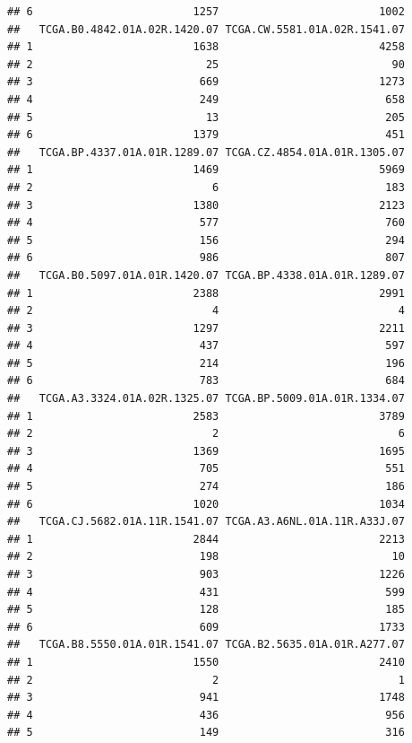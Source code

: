 \documentclass[
]{article}
\begin{document}
\begin{verbatim}
## 6                         1257                         1002
##   TCGA.B0.4842.01A.02R.1420.07 TCGA.CW.5581.01A.02R.1541.07
## 1                         1638                         4258
## 2                           25                           90
## 3                          669                         1273
## 4                          249                          658
## 5                           13                          205
## 6                         1379                          451
##   TCGA.BP.4337.01A.01R.1289.07 TCGA.CZ.4854.01A.01R.1305.07
## 1                         1469                         5969
## 2                            6                          183
## 3                         1380                         2123
## 4                          577                          760
## 5                          156                          294
## 6                          986                          807
##   TCGA.B0.5097.01A.01R.1420.07 TCGA.BP.4338.01A.01R.1289.07
## 1                         2388                         2991
## 2                            4                            4
## 3                         1297                         2211
## 4                          437                          597
## 5                          214                          196
## 6                          783                          684
##   TCGA.A3.3324.01A.02R.1325.07 TCGA.BP.5009.01A.01R.1334.07
## 1                         2583                         3789
## 2                            2                            6
## 3                         1369                         1695
## 4                          705                          551
## 5                          274                          186
## 6                         1020                         1034
##   TCGA.CJ.5682.01A.11R.1541.07 TCGA.A3.A6NL.01A.11R.A33J.07
## 1                         2844                         2213
## 2                          198                           10
## 3                          903                         1226
## 4                          431                          599
## 5                          128                          185
## 6                          609                         1733
##   TCGA.B8.5550.01A.01R.1541.07 TCGA.B2.5635.01A.01R.A277.07
## 1                         1550                         2410
## 2                            2                            1
## 3                          941                         1748
## 4                          436                          956
## 5                          149                          316

\end{verbatim}
\end{document}
